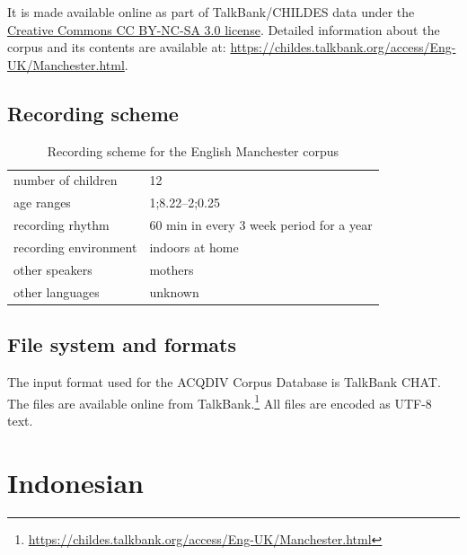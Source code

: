 \documentclass[a4paper, 11pt]{book}
\begin{document}
\noindent It is made available online as part of TalkBank/CHILDES data under the \href{https://creativecommons.org/licenses/by-nc-sa/3.0/)}{Creative Commons CC BY-NC-SA 3.0 license}. Detailed information about the corpus and its contents are available at: \url{https://childes.talkbank.org/access/Eng-UK/Manchester.html}.

\subsection{Recording scheme}

\begin{table}[ht]
	\centering
	\begin{tabular}{ll}
		\toprule
		number of children 	& 12 \\
		age ranges 			& 1;8.22--2;0.25 \\ %
		recording rhythm 	& 60 min in every 3 week period for a year \\
		recording environment & indoors at home \\
		other speakers 		& mothers \\
		other languages		& unknown \\ %
		\bottomrule
	\end{tabular}
	\caption{Recording scheme for the English Manchester corpus}
	\label{tab:English Manchester recording scheme}
\end{table}


\subsection{File system and formats}

The input format used for the ACQDIV Corpus Database is TalkBank CHAT. The files are available online from TalkBank.\footnote{\url{https://childes.talkbank.org/access/Eng-UK/Manchester.html}} All files are encoded as UTF-8 text.


\section{Indonesian}
\label{sec:Indonesian}
\end{document}
